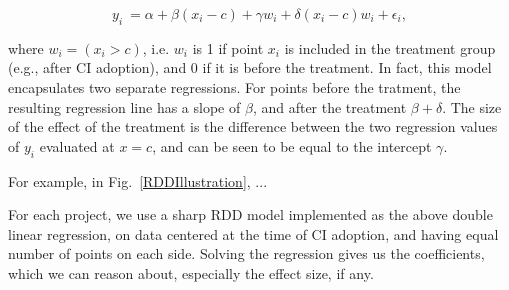\[y_i \ = \alpha + \beta(x_i-c) + \gamma w_i + \delta(x_i-c)w_i + \epsilon_i,\]

\noindent where $w_i = (x_i > c)$, i.e. $w_i$ is 1 if point $x_i$ is included in the treatment group (e.g., after CI adoption), and 0 if it is before the treatment.
In fact, this model encapsulates two separate regressions.
For points before the tratment, the resulting regression line has a slope of $\beta$, and after the treatment $\beta + \delta$.
The size of the effect of the treatment is the difference between the two regression values of $y_i$ evaluated at $x=c$, and can be seen to be equal to the intercept $\gamma$.

For example, in Fig.~\ref{RDDIllustration}, ...

For each project, we use a sharp RDD model implemented as the above double linear regression, on data centered at the time of CI adoption, and having equal number of points on each side.
Solving the regression gives us the coefficients, which we can reason about, especially the effect size, if any.
 




